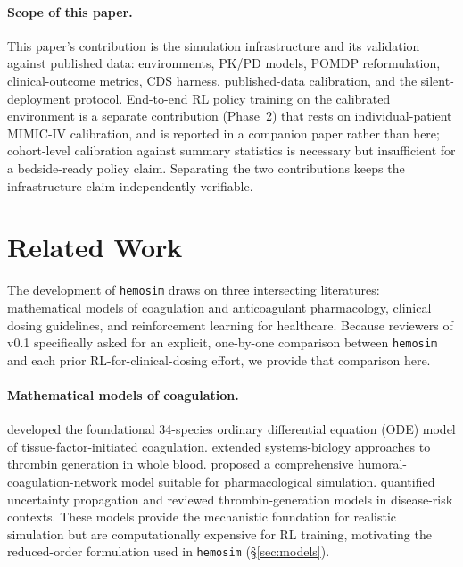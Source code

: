 \documentclass[11pt]{article}
\begin{document}
\paragraph{Scope of this paper.}
This paper's contribution is the simulation infrastructure and its validation against published data: environments, PK/PD models, POMDP reformulation, clinical-outcome metrics, CDS harness, published-data calibration, and the silent-deployment protocol. End-to-end RL policy training on the calibrated environment is a separate contribution (Phase~2) that rests on individual-patient MIMIC-IV \citep{johnson2023mimic4} calibration, and is reported in a companion paper rather than here; cohort-level calibration against summary statistics is necessary but insufficient for a bedside-ready policy claim. Separating the two contributions keeps the infrastructure claim independently verifiable.

\section{Related Work}
\label{sec:related_work}

The development of \texttt{hemosim} draws on three intersecting literatures: mathematical models of coagulation and anticoagulant pharmacology, clinical dosing guidelines, and reinforcement learning for healthcare. Because reviewers of v0.1 specifically asked for an explicit, one-by-one comparison between \texttt{hemosim} and each prior RL-for-clinical-dosing effort, we provide that comparison here.

\paragraph{Mathematical models of coagulation.}
\citet{hockin2002} developed the foundational 34-species ordinary differential equation (ODE) model of tissue-factor-initiated coagulation. \citet{chatterjee2010} extended systems-biology approaches to thrombin generation in whole blood. \citet{wajima2009} proposed a comprehensive humoral-coagulation-network model suitable for pharmacological simulation. \citet{danforth2009} quantified uncertainty propagation and \citet{brummelziedins2013} reviewed thrombin-generation models in disease-risk contexts. These models provide the mechanistic foundation for realistic simulation but are computationally expensive for RL training, motivating the reduced-order formulation used in \texttt{hemosim} (\S\ref{sec:models}).
\end{document}
